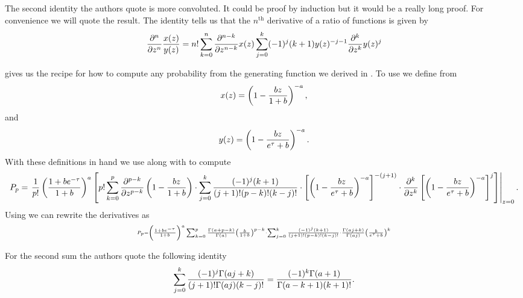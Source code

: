 The second identity the authors quote is more convoluted. It could be proof by
induction but it would be a really long proof. For convenience we will quote
the result. The identity tells us that the $n^{\text{th}}$ derivative of a ratio
of functions is given by
\begin{equation}
  {\partial ^n \over \partial z^n} {x(z) \over y(z)} =
  n! \sum_{k=0}^n {\partial ^{n-k} \over \partial z^{n-k}} x(z)
  \sum_{j = 0}^k (-1)^j (k + 1) y(z)^{-j-1}
  {\partial^k \over \partial z^k} y(z)^j
  \label{eq_derivative_ratio}
\end{equation}

 gives us the recipe for how to compute any
probability from the generating function we derived in
. To use  we define from
\begin{equation}
  x(z) = \left( 1 - {b z \over 1 + b} \right)^{-a},
\end{equation}
and
\begin{equation}
  y(z) = \left( 1 - {b z \over e^{\tau} + b} \right)^{-a}.
\end{equation}
With these definitions in hand we use  along with
 to compute
\begin{equation}
  \tiny
  P_p = \left. {1 \over p!} \left( {1 + b e^{-\tau} \over 1 + b} \right)^a
  \left[ p! \sum_{k=0}^p  {\partial^{p-k} \over \partial z^{p-k}}
  \left(1 - {b z \over 1 + b} \right) \cdot
  \sum_{j=0}^k {(-1)^j (k + 1) \over (j + 1)! (p - k)! (k - j)!} \cdot
  \left[ \left( 1 - {b z \over e^\tau + b} \right)^{-a} \right]^{-(j+1)} \cdot
  {\partial^k \over \partial z^k}
  \left[ \left( 1 - {b z \over e^\tau + b}  \right)^{-a} \right]^j
  \right]\right\vert _{z=0}.
\end{equation}
Using  we can rewrite the derivatives as
\begin{equation}
  \scriptscriptstyle
  P_p = \left( {1 + b e^{-\tau} \over 1 + b} \right)^a
  \sum_{k=0}^p {\Gamma(a + p - k) \over \Gamma(a)}
  \left( {b \over 1 + b} \right)^{p - k} \cdot
  \sum_{j=0}^k {(-1)^j (k + 1) \over (j + 1)! (p - k)! (k - j)!} \cdot
  {\Gamma(aj + k) \over \Gamma(aj)} \left( {b \over e^\tau + b} \right)^k
\end{equation}

For the second sum the authors quote the following identity
\begin{equation}
  \sum_{j=0}^k {(-1)^j \Gamma(aj + k) \over (j + 1)! \Gamma(aj) (k - j)!} =
  {(-1)^k \Gamma(a + 1) \over \Gamma(a - k + 1) (k + 1)!}.
\end{equation}

